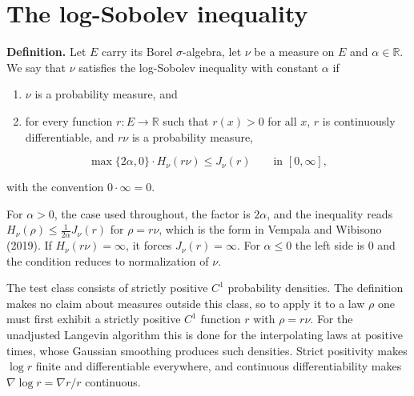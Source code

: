 \documentclass[11pt,a4paper]{article}
\begin{document}
\section{\texorpdfstring{The log-Sobolev inequality}{The log-Sobolev inequality}}


\textbf{Definition.} Let \(E\) carry its Borel \(\sigma\)-algebra, let \(\nu\) be a measure on \(E\) and \(\alpha\in\mathbb R\). We say that \(\nu\) satisfies the log-Sobolev inequality with constant \(\alpha\) if



\begin{enumerate}


\item \(\nu\) is a probability measure, and

\item for every function \(r:E\to\mathbb R\) such that \(r(x)>0\) for all \(x\), \(r\) is continuously differentiable, and \(r\nu\) is a probability measure,

\end{enumerate}

\[\max\{2\alpha,0\}\cdot H_\nu(r\nu)\le J_\nu(r)\qquad\text{in }[0,\infty],\]


with the convention \(0\cdot\infty=0\).




For \(\alpha>0\), the case used throughout, the factor is \(2\alpha\), and the inequality reads \(H_\nu(\rho)\le\frac1{2\alpha}J_\nu(r)\) for \(\rho=r\nu\), which is the form in Vempala and Wibisono (2019). If \(H_\nu(r\nu)=\infty\), it forces \(J_\nu(r)=\infty\). For \(\alpha\le0\) the left side is \(0\) and the condition reduces to normalization of \(\nu\).




The test class consists of strictly positive \(C^1\) probability densities. The definition makes no claim about measures outside this class, so to apply it to a law \(\rho\) one must first exhibit a strictly positive \(C^1\) function \(r\) with \(\rho=r\nu\). For the unadjusted Langevin algorithm this is done for the interpolating laws at positive times, whose Gaussian smoothing produces such densities. Strict positivity makes \(\log r\) finite and differentiable everywhere, and continuous differentiability makes \(\nabla\log r=\nabla r/r\) continuous.
\end{document}

